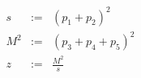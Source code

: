 \documentclass[10pt]{article}
\begin{document}
\begin{eqnarray*}
s &:=& (p_1 + p_2)^2 \\
\nonumber
M^2 &:=& (p_3 + p_4 + p_5)^2 \\
\nonumber
z &:=& \frac{M^2}{s}
\end{eqnarray*}
\end{document}
